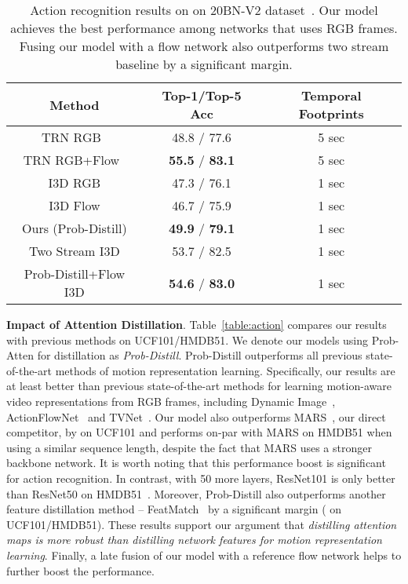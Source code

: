 \documentclass{bmvc2k}
\newcommand{\tablestyle}[2]{\setlength{\tabcolsep}{#1}\renewcommand{\arraystretch}{#2}\centering\footnotesize}
\begin{document}
\begin{table}[h]
\centering
\tablestyle{2pt}{1.0}
\setlength{\tabcolsep}{6pt} \renewcommand{\arraystretch}{1} \footnotesize
\begin{tabular}{c|cc}
Method                                 & Top-1/Top-5 Acc  & Temporal Footprints  \\ \hline 
TRN RGB~\cite{zhou2017temporal}        & 48.8 / 77.6      & 5 sec        \\
TRN RGB+Flow~\cite{zhou2017temporal}   & \textbf{55.5} / \textbf{83.1}      & 5 sec        \\ \hline
I3D RGB               & 47.3 / 76.1      & 1 sec     \\
I3D Flow                   & 46.7 / 75.9      & 1 sec      \\ 
Ours (Prob-Distill)                             & \textbf{49.9} / \textbf{79.1}      & 1 sec        \\
\hdashline
Two Stream I3D                  & 53.7 / 82.5      & 1 sec      \\ 
Prob-Distill+Flow I3D                            & \textbf{54.6} / \textbf{83.0}      & 1 sec        \\
\end{tabular}\vspace{0.1em}
\caption{Action recognition results on on 20BN-V2 dataset~\cite{mahdisoltani2018fine}. Our model achieves the best performance among networks that uses RGB frames. Fusing our model with a flow network also outperforms two stream baseline by a significant margin.\vspace{-1em}}
\label{table:20bn}
\end{table}

\noindent \textbf{Impact of Attention Distillation}. Table~\ref{table:action} compares our results with previous methods on UCF101/HMDB51. We denote our models using Prob-Atten for distillation as {\it Prob-Distill}. Prob-Distill outperforms all previous state-of-the-art methods of motion representation learning. Specifically, our results are at least  better than previous state-of-the-art methods for learning motion-aware video representations from RGB frames, including Dynamic Image~\cite{bilen2018action}, ActionFlowNet~\cite{ng2016actionflownet} and TVNet~\cite{fan2018end}. Our model also outperforms MARS~\cite{crasto2019mars}, our direct competitor, by  on UCF101 and performs on-par with MARS on HMDB51 when using a similar sequence length, despite the fact that MARS uses a stronger backbone network. It is worth noting that this performance boost is significant for action recognition. In contrast, with 50 more layers, ResNet101 is only  better than ResNet50 on HMDB51~\cite{hara2018can}. Moreover, Prob-Distill also outperforms another feature distillation method -- FeatMatch~\cite{Zagoruyko2017AT} by a significant margin ( on UCF101/HMDB51). These results support our argument that \emph{distilling attention maps is more robust than distilling network features for motion representation learning}. Finally, a late fusion of our model with a reference flow network helps to further boost the performance. 
\end{document}
